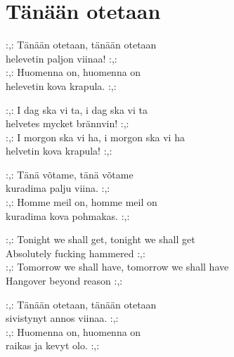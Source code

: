 \section{Tänään otetaan}

:,: Tänään otetaan, tänään otetaan\\
helevetin paljon viinaa! :,:\\
:,: Huomenna on, huomenna on\\
helevetin kova krapula. :,:

:,: I dag ska vi ta, i dag ska vi ta\\
helvetes mycket brännvin! :,:\\
:,: I morgon ska vi ha, i morgon ska vi ha\\
helvetin kova krapula! :,:

:,: Tänä võtame, tänä võtame\\
kuradima palju viina. :,:\\
:,: Homme meil on, homme meil on\\
kuradima kova pohmakas. :,:

:,: Tonight we shall get, tonight we shall get\\
Absolutely fucking hammered :,:\\
:,: Tomorrow we shall have, tomorrow we shall have\\
Hangover beyond reason :,:

:,: Tänään otetaan, tänään otetaan\\
sivistynyt annos viinaa. :,:\\
:,: Huomenna on, huomenna on\\
raikas ja kevyt olo. :,: